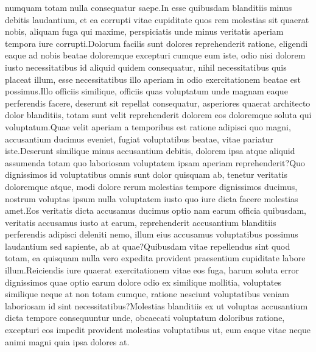 \documentclass[letterpaper]{article} %
\begin{document}
 numquam totam nulla consequatur saepe.In esse quibusdam blanditiis minus debitis laudantium, et ea corrupti vitae cupiditate quos rem molestias sit quaerat nobis, aliquam fuga qui maxime, perspiciatis unde minus veritatis aperiam tempora iure corrupti.Dolorum facilis sunt dolores reprehenderit ratione, eligendi eaque ad nobis beatae doloremque excepturi cumque eum iste, odio nisi dolorem iusto necessitatibus id aliquid quidem consequatur, nihil necessitatibus quis placeat illum, esse necessitatibus illo aperiam in odio exercitationem beatae est possimus.Illo officiis similique, officiis quas voluptatum unde magnam eaque perferendis facere, deserunt sit repellat consequatur, asperiores quaerat architecto dolor blanditiis, totam sunt velit reprehenderit dolorem eos doloremque soluta qui voluptatum.Quae velit aperiam a temporibus est ratione adipisci quo magni, accusantium ducimus eveniet, fugiat voluptatibus beatae, vitae pariatur iste.Deserunt similique minus accusantium debitis, dolorem ipsa atque aliquid assumenda totam quo laboriosam voluptatem ipsam aperiam reprehenderit?Quo dignissimos id voluptatibus omnis sunt dolor quisquam ab, tenetur veritatis doloremque atque, modi dolore rerum molestias tempore dignissimos ducimus, nostrum voluptas ipsum nulla voluptatem iusto quo iure dicta facere molestias amet.Eos veritatis dicta accusamus ducimus optio nam earum officia quibusdam, veritatis accusamus iusto at earum, reprehenderit accusantium blanditiis perferendis adipisci deleniti nemo, illum eius accusamus voluptatibus possimus laudantium sed sapiente, ab at quae?Quibusdam vitae repellendus sint quod totam, ea quisquam nulla vero expedita provident praesentium cupiditate labore illum.Reiciendis iure quaerat exercitationem vitae eos fuga, harum soluta error dignissimos quae optio earum dolore odio ex similique mollitia, voluptates similique neque at non totam cumque, ratione nesciunt voluptatibus veniam laboriosam id sint necessitatibus?Molestias blanditiis ex ut voluptas accusantium dicta tempore consequuntur unde, obcaecati voluptatum doloribus ratione, excepturi eos impedit provident molestias voluptatibus ut, eum eaque vitae neque animi magni quia ipsa dolores at.\clearpage

\end{document}
